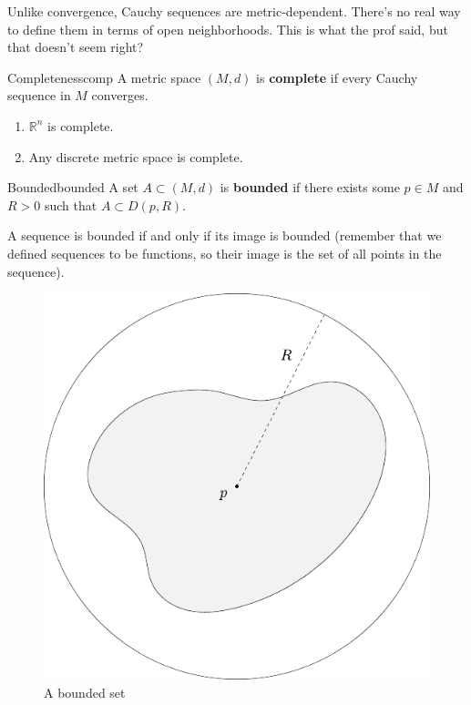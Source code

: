 \documentclass[10pt]{report}
\begin{document}
Unlike convergence, Cauchy sequences are metric-dependent. There's no real way to define them in terms of open neighborhoods. {\color{red}This is what the prof said, but that doesn't seem right?} 

\begin{defn}{Completeness}{comp}
	A metric space $(M,d)$ is \textbf{complete} if every Cauchy sequence in $M$ converges.
\end{defn}

\begin{ex}{}{}
	\begin{enumerate}
		\item $\mathbb{R}^n$ is complete.
		\item Any discrete metric space is complete.
	\end{enumerate}
\end{ex}

\begin{defn}{Bounded}{bounded}
	A set $A \subset (M,d)$ is \textbf{bounded} if there exists some $p \in M$ and $R>0$ such that $A \subset D(p,R)$.

	A sequence is bounded if and only if its image is bounded (remember that we defined sequences to be functions, so their image is the set of all points in the sequence).
\end{defn}

\begin{figure}[H]
	\centering
	\includegraphics[scale=0.7]{fig/bounded.pdf}
	\caption{A bounded set}
\end{figure}
\end{document}

